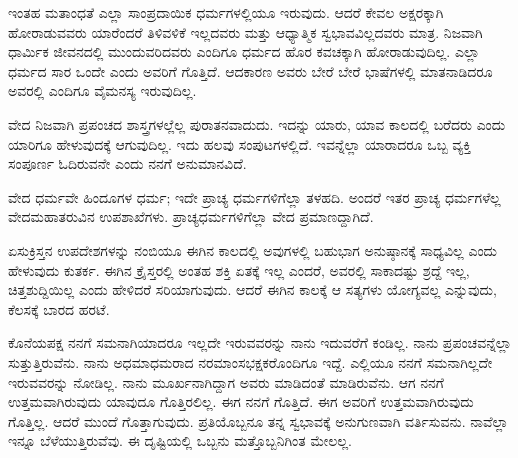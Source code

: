 ಇಂತಹ ಮತಾಂಧತೆ ಎಲ್ಲಾ ಸಾಂಪ್ರದಾಯಿಕ ಧರ್ಮಗಳಲ್ಲಿಯೂ ಇರುವುದು. ಆದರೆ ಕೇವಲ ಅಕ್ಷರಕ್ಕಾಗಿ ಹೋರಾಡುವವರು ಯಾರೆಂದರೆ ತಿಳಿವಳಿಕೆ ಇಲ್ಲದವರು ಮತ್ತು ಆಧ್ಯಾತ್ಮಿಕ ಸ್ವಭಾವವಿಲ್ಲದವರು ಮಾತ್ರ. ನಿಜವಾಗಿ ಧಾರ್ಮಿಕ ಜೀವನದಲ್ಲಿ ಮುಂದುವರಿದವರು ಎಂದಿಗೂ ಧರ್ಮದ ಹೊರ ಕವಚಕ್ಕಾಗಿ ಹೋರಾಡುವುದಿಲ್ಲ. ಎಲ್ಲಾ ಧರ್ಮದ ಸಾರ ಒಂದೇ ಎಂದು ಅವರಿಗೆ ಗೊತ್ತಿದೆ. ಆದಕಾರಣ ಅವರು ಬೇರೆ ಬೇರೆ ಭಾಷೆಗಳಲ್ಲಿ ಮಾತನಾಡಿದರೂ ಅವರಲ್ಲಿ ಎಂದಿಗೂ ವೈಮನಸ್ಯ ಇರುವುದಿಲ್ಲ.

ವೇದ ನಿಜವಾಗಿ ಪ್ರಪಂಚದ ಶಾಸ್ತ್ರಗಳಲ್ಲೆಲ್ಲ ಪುರಾತನವಾದುದು. ಇದನ್ನು ಯಾರು, ಯಾವ ಕಾಲದಲ್ಲಿ ಬರೆದರು ಎಂದು ಯಾರಿಗೂ ಹೇಳುವುದಕ್ಕೆ ಆಗುವುದಿಲ್ಲ. ಇದು ಹಲವು ಸಂಪುಟಗಳಲ್ಲಿದೆ. ಇವನ್ನೆಲ್ಲಾ ಯಾರಾದರೂ ಒಬ್ಬ ವ್ಯಕ್ತಿ ಸಂಪೂರ್ಣ ಓದಿರುವನೇ ಎಂದು ನನಗೆ ಅನುಮಾನವಿದೆ.

ವೇದ ಧರ್ಮವೇ ಹಿಂದೂಗಳ ಧರ್ಮ; ಇದೇ ಪ್ರಾಚ್ಯ ಧರ್ಮಗಳಿಗೆಲ್ಲಾ ತಳಹದಿ. ಅಂದರೆ ಇತರ ಪ್ರಾಚ್ಯ ಧರ್ಮಗಳೆಲ್ಲ ವೇದಮಹಾತರುವಿನ ಉಪಶಾಖೆಗಳು. ಪ್ರಾಚ್ಯಧರ್ಮಗಳಿಗೆಲ್ಲಾ ವೇದ ಪ್ರಮಾಣದ್ದಾಗಿದೆ.

ಏಸುಕ್ರಿಸ್ತನ ಉಪದೇಶಗಳನ್ನು ನಂಬಿಯೂ ಈಗಿನ ಕಾಲದಲ್ಲಿ ಅವುಗಳಲ್ಲಿ ಬಹುಭಾಗ ಅನುಷ್ಠಾನಕ್ಕೆ ಸಾಧ್ಯವಿಲ್ಲ ಎಂದು ಹೇಳುವುದು ಕುತರ್ಕ. ಈಗಿನ ಕ್ರೈಸ್ತರಲ್ಲಿ ಅಂತಹ ಶಕ್ತಿ ಏತಕ್ಕೆ ಇಲ್ಲ ಎಂದರೆ, ಅವರಲ್ಲಿ ಸಾಕಾದಷ್ಟು ಶ್ರದ್ದೆ ಇಲ್ಲ, ಚಿತ್ತಶುದ್ದಿಯಿಲ್ಲ ಎಂದು ಹೇಳಿದರೆ ಸರಿಯಾಗುವುದು. ಆದರೆ ಈಗಿನ ಕಾಲಕ್ಕೆ ಆ ಸತ್ಯಗಳು ಯೋಗ್ಯವಲ್ಲ ಎನ್ನುವುದು, ಕೆಲಸಕ್ಕೆ ಬಾರದ ಹರಟೆ.

ಕೊನೆಯಪಕ್ಷ ನನಗೆ ಸಮನಾಗಿಯಾದರೂ ಇಲ್ಲದೇ ಇರುವವರನ್ನು ನಾನು ಇದುವರೆಗೆ ಕಂಡಿಲ್ಲ. ನಾನು ಪ್ರಪಂಚವನ್ನೆಲ್ಲಾ ಸುತ್ತುತ್ತಿರುವೆನು. ನಾನು ಅಧಮಾಧಮರಾದ ನರಮಾಂಸಭಕ್ಷಕರೊಂದಿಗೂ ಇದ್ದೆ. ಎಲ್ಲಿಯೂ ನನಗೆ ಸಮನಾಗಿಲ್ಲದೇ ಇರುವವರನ್ನು ನೋಡಿಲ್ಲ. ನಾನು ಮೂರ್ಖನಾಗಿದ್ದಾಗ ಅವರು ಮಾಡಿದಂತೆ ಮಾಡಿರುವೆನು. ಆಗ ನನಗೆ ಉತ್ತಮವಾಗಿರುವುದು ಯಾವುದೂ ಗೊತ್ತಿರಲಿಲ್ಲ. ಈಗ ನನಗೆ ಗೊತ್ತಿದೆ. ಈಗ ಅವರಿಗೆ ಉತ್ತಮವಾಗಿರುವುದು ಗೊತ್ತಿಲ್ಲ. ಆದರೆ ಮುಂದೆ ಗೊತ್ತಾಗುವುದು. ಪ್ರತಿಯೊಬ್ಬನೂ ತನ್ನ ಸ್ವಭಾವಕ್ಕೆ ಅನುಗುಣವಾಗಿ ವರ್ತಿಸುವನು. ನಾವೆಲ್ಲಾ ಇನ್ನೂ ಬೆಳೆಯುತ್ತಿರುವೆವು. ಈ ದೃಷ್ಟಿಯಲ್ಲಿ ಒಬ್ಬನು ಮತ್ತೊಬ್ಬನಿಗಿಂತ ಮೇಲಲ್ಲ.

